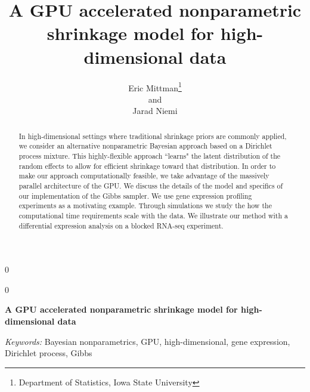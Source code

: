 \documentclass[12pt]{article}
\newcommand{\blind}{0}
\begin{document}
\newtoggle{thesis}
\togglefalse{thesis}

%

\def\spacingset#1{\renewcommand{\baselinestretch}%
{#1}\small\normalsize} \spacingset{1}
  
  
    
    \blind
  {
    \title{\bf A GPU accelerated nonparametric shrinkage model for high-dimensional data}
    \author{Eric Mittman\thanks{Department of Statistics, Iowa State University}\\
    and\\
    Jarad Niemi\footnotemark[1]}
      
      
    \maketitle
  } \fi
  
  \blind
  {
    \bigskip
    \bigskip
    \bigskip
    \begin{center}
    {\LARGE\bf A GPU accelerated nonparametric shrinkage model for high-dimensional data}
    \end{center}
    \medskip
  } \fi
  
  \bigskip
  \begin{abstract}
  In high-dimensional settings where traditional shrinkage priors are commonly applied, we consider an alternative nonparametric Bayesian approach based on a Dirichlet process mixture. This highly-flexible approach ``learns" the latent distribution of the random effects to allow for efficient shrinkage toward that distribution. In order to make our approach computationally feasible, we take advantage of the massively parallel architecture of the GPU. We discuss the details of the model and specifics of our implementation of the Gibbs sampler. We use gene expression profiling experiments as a motivating example. Through simulations we study the how the computational time requirements scale with the data. We illustrate our method with a differential expression analysis on a blocked RNA-seq experiment.
  \end{abstract}
  
  \noindent%
  {\it Keywords:}  Bayesian nonparametrics, GPU, high-dimensional, gene expression, Dirichlet process, Gibbs
  
  \spacingset{1.45}
  
  
\end{document}
